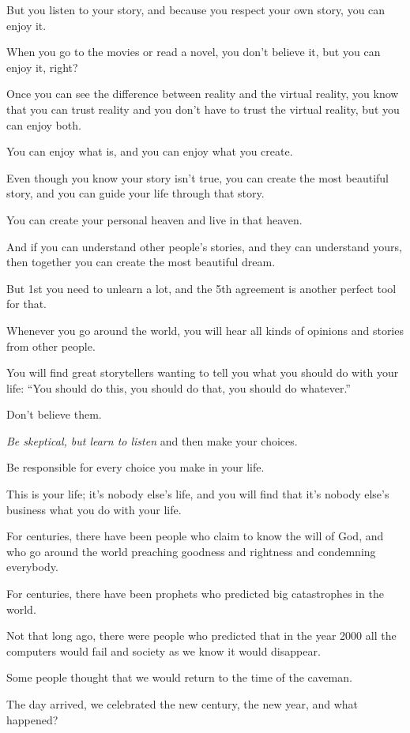 \documentclass{article}
\numberwithin{equation}{section}
\begin{document}
But you listen to your story, and because you respect your own story, you can enjoy it.

When you go to the movies or read a novel, you don't believe it, but you can enjoy it, right?

Once you can see the difference between reality and the virtual reality, you know that you can trust reality and you don't have to trust the virtual reality, but you can enjoy both.

You can enjoy what is, and you can enjoy what you create.

Even though you know your story isn't true, you can create the most beautiful story, and you can guide your life through that story.

You can create your personal heaven and live in that heaven.

And if you can understand other people's stories, and they can understand yours, then together you can create the most beautiful dream.

But 1st you need to unlearn a lot, and the 5th agreement is another perfect tool for that.

%
Whenever you go around the world, you will hear all kinds of opinions and stories from other people.

You will find great storytellers wanting to tell you what you should do with your life: ``You should do this, you should do that, you should do whatever.''

Don't believe them.

\textit{Be skeptical, but learn to listen} and then make your choices.

Be responsible for every choice you make in your life.

This is your life; it's nobody else's life, and you will find that it's nobody else's business what you do with your life.

%
For centuries, there have been people who claim to know the will of God, and who go around the world preaching goodness and rightness and condemning everybody.

For centuries, there have been prophets who predicted big catastrophes in the world.

Not that long ago, there were people who predicted that in the year 2000 all the computers would fail and society as we know it would disappear.

Some people thought that we would return to the time of the caveman.

The day arrived, we celebrated the new century, the new year, and what happened?
\end{document}
